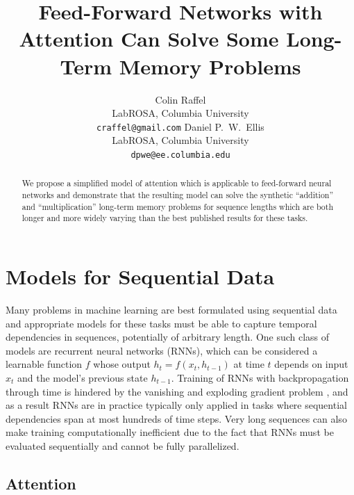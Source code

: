 \documentclass{article} %
\title{Feed-Forward Networks with Attention Can Solve Some Long-Term Memory Problems}
\author{Colin Raffel\\
LabROSA, Columbia University\\
\texttt{craffel@gmail.com}
\And
Daniel P.~W.~Ellis\\
LabROSA, Columbia University\\
\texttt{dpwe@ee.columbia.edu}
}
\begin{document}
\maketitle

\begin{abstract}
We propose a simplified model of attention which is applicable to feed-forward neural networks and demonstrate that the resulting model can solve the synthetic ``addition'' and ``multiplication'' long-term memory problems for sequence lengths which are both longer and more widely varying than the best published results for these tasks.
\end{abstract}

\section{Models for Sequential Data}

Many problems in machine learning are best formulated using sequential data and appropriate models for these tasks must be able to capture temporal dependencies in sequences, potentially of arbitrary length.
One such class of models are recurrent neural networks (RNNs), which can be considered a learnable function $f$ whose output $h_t = f(x_t, h_{t - 1})$ at time $t$ depends on input $x_t$ and the model's previous state $h_{t - 1}$.
Training of RNNs with backpropagation through time \cite{werbos1990backpropagation} is hindered by the vanishing and exploding gradient problem \cite{pascanu2012difficulty,hochreiter1997long,bengio1994learning}, and as a result RNNs are in practice typically only applied in tasks where sequential dependencies span at most hundreds of time steps.
Very long sequences can also make training computationally inefficient due to the fact that RNNs must be evaluated sequentially and cannot be fully parallelized.

\subsection{Attention}
\end{document}
